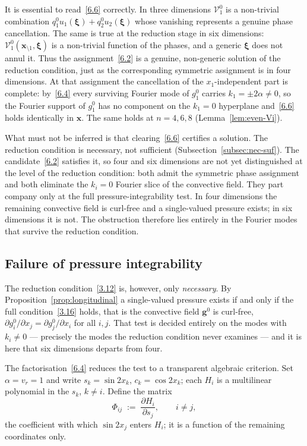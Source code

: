 \documentclass[11pt]{jfm}
\numberwithin{equation}{section}
\begin{document}
It is essential to read~\eqref{6.6} correctly. In three dimensions $\mathcal{V}_1^0$ is a non-trivial combination $q_1^0u_1(\boldsymbol{\xi})+q_2^0u_2(\boldsymbol{\xi})$ whose vanishing represents a genuine phase cancellation. The same is true at the reduction stage in six dimensions: $\mathcal{V}_1^0(\boldsymbol{x}_{\setminus1},\boldsymbol{\xi})$ is a non-trivial function of the phases, and a generic $\boldsymbol{\xi}$ does not annul it. Thus the assignment~\eqref{6.2} is a genuine, non-generic solution of the reduction condition, just as the corresponding symmetric assignment is in four dimensions. At that assignment the cancellation of the $x_1$-independent part is
complete: by~\eqref{6.4} every surviving Fourier mode of $g_1^0$ carries
$k_1=\pm2\alpha\neq0$, so the Fourier support of $g_1^0$ has no component on the $k_1=0$
hyperplane and~\eqref{6.6} holds identically in $\boldsymbol{x}$. The same holds at $n=4,6,8$
(Lemma~\ref{lem:even-Vi}).

What must not be inferred is that clearing~\eqref{6.6} certifies a solution. The reduction
condition is necessary, not sufficient (Subsection~\ref{subsec:nec-suf}). The
candidate~\eqref{6.2} satisfies it, so four and six dimensions are not yet distinguished at
the level of the reduction condition: both admit the symmetric phase assignment and both
eliminate the $k_i=0$ Fourier slice of the convective field. They part company only at the
full pressure-integrability test. In four dimensions the remaining convective field is
curl-free and a single-valued pressure exists; in six dimensions it is not. The obstruction
therefore lies entirely in the Fourier modes that survive the reduction condition.

\subsection{Failure of pressure integrability}
\label{subsec:6D-integrability}
The reduction condition~\eqref{3.12} is, however, only \emph{necessary}. By
Proposition~\ref{prop:longitudinal} a single-valued pressure exists if and only if the full
condition~\eqref{3.16} holds, that is the convective field $\boldsymbol{g}^0$ is curl-free,
$\partial g_i^0/\partial x_j = \partial g_j^0/\partial x_i$ for all $i,j$. That test is
decided entirely on the modes with $k_i\neq0$ --- precisely the modes the reduction condition
never examines --- and it is here that six dimensions departs from four.

The factorisation~\eqref{6.4} reduces the test to a transparent algebraic criterion. Set
$\alpha=v_r=1$ and write $s_k=\sin 2x_k$, $c_k=\cos 2x_k$; each $H_i$ is a multilinear
polynomial in the $s_k$, $k\neq i$. Define the matrix
\begin{equation}
\label{6.7}
\Phi_{ij} \;:=\; \frac{\partial H_i}{\partial s_j}, \qquad i\neq j,
\end{equation}
the coefficient with which $\sin 2x_j$ enters $H_i$; it is a function of the remaining
coordinates only.
\end{document}
